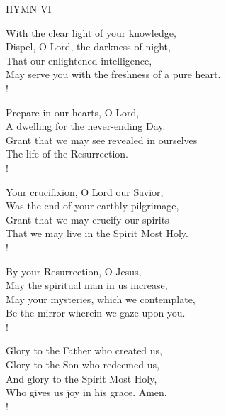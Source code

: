 \noindent\small{\uppercase{Hymn VI}}\normalsize\label{ordinaryTime:sixthHymn}
\begin{cverse}
With the clear light of your knowledge,\\
Dispel, O Lord, the darkness of night,\\
That our enlightened intelligence,\\
May serve you with the freshness of a pure heart.\\!

Prepare in our hearts, O Lord,\\
A dwelling for the never-ending Day.\\
Grant that we may see revealed in ourselves\\
The life of the Resurrection.\\!

Your crucifixion, O Lord our Savior,\\
Was the end of your earthly pilgrimage,\\
Grant that we may crucify our spirits\\
That we may live in the Spirit Most Holy.\\!

By your Resurrection, O Jesus,\\
May the spiritual man in us increase,\\
May your mysteries, which we contemplate,\\
Be the mirror wherein we gaze upon you.\\!

Glory to the Father who created us,\\
Glory to the Son who redeemed us,\\
And glory to the Spirit Most Holy,\\
Who gives us joy in his grace. Amen.\\!
\end{cverse}

